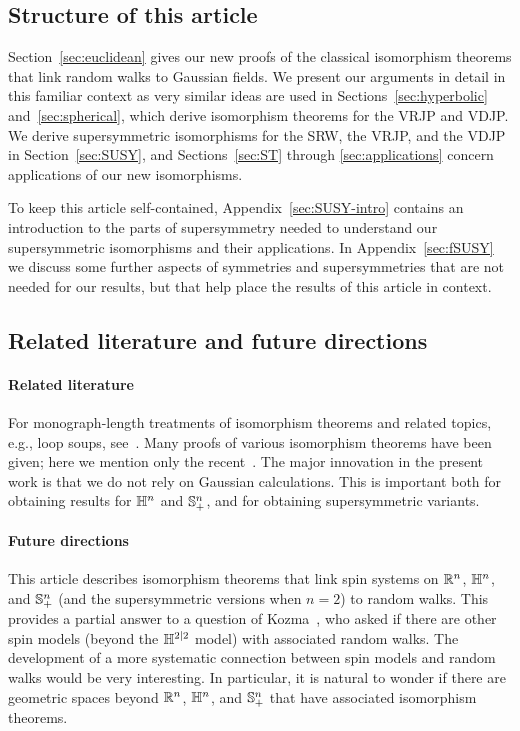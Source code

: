 \documentclass[11pt,a4paper]{article}
\begin{document}
\subsection{Structure of this article}
\label{sec:struct-this-article}

Section~\ref{sec:euclidean} gives our new proofs of the classical
isomorphism theorems that link random walks
to Gaussian fields. We present our arguments in detail in this
familiar context as very similar ideas are used in
Sections~\ref{sec:hyperbolic} and~\ref{sec:spherical}, which derive
isomorphism theorems for the VRJP and VDJP. We derive supersymmetric
isomorphisms for the SRW, the VRJP, and the VDJP in
Section~\ref{sec:SUSY}, and
Sections~\ref{sec:ST} through \ref{sec:applications} concern applications
of our new isomorphisms.

To keep this article self-contained, Appendix~\ref{sec:SUSY-intro}
contains an introduction to the parts of supersymmetry needed to
understand our supersymmetric isomorphisms and their
applications. In Appendix~\ref{sec:fSUSY} we discuss some
further aspects of symmetries and supersymmetries that are not
needed for our results, but that help place the results of this
article in context.


\subsection{Related literature and future directions}
\label{sec:related-literature}

\paragraph{Related literature}
For monograph-length treatments of isomorphism theorems and related
topics, e.g., loop soups, see~\cite{MR2932978,MR2250510}.
Many proofs of various isomorphism theorems have been given; here we
mention only the recent~\cite{MR3520013,1607.05201}. The major
innovation in the present work is that we do not rely on Gaussian
calculations. This is important both for obtaining results for
$\mathbb{H}^{n}$ and ${\mathbb S}^{n}_{+}$, and for obtaining supersymmetric
variants.

\paragraph{Future directions}

This article describes isomorphism theorems that link spin systems on
$\mathbb{R}^{n}$, $\mathbb{H}^{n}$, and ${\mathbb S}^{n}_{+}$ (and the supersymmetric
versions when $n=2$) to random walks. This provides a partial answer
to a question of Kozma~\cite{MR3469136}, who asked if there are other
spin models (beyond the $\mathbb{H}^{2|2}$ model) with associated random
walks. The development of a more systematic connection between spin
models and random walks would be very interesting. In particular, it
is natural to wonder if there are geometric spaces beyond $\mathbb{R}^{n}$,
$\mathbb{H}^{n}$, and ${\mathbb S}^{n}_{+}$ that have associated isomorphism
theorems.
\end{document}
